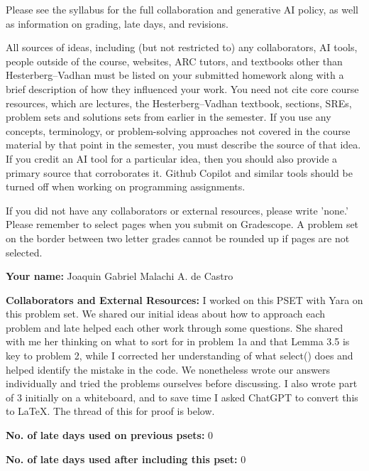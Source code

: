 \documentclass[11pt]{report}
\begin{document}

Please see the syllabus for the full collaboration and generative AI policy, as well as information on grading, late days, and revisions.

All sources of ideas, including (but not restricted to) any collaborators, AI tools, people outside of the course, websites, ARC tutors, and textbooks other than Hesterberg--Vadhan must be listed on your submitted homework along with a brief description of how they influenced your work. You need not cite core course resources, which are lectures, the Hesterberg--Vadhan textbook, sections, SREs, problem sets and solutions sets from earlier in the semester. If you use any concepts, terminology, or problem-solving approaches not covered in the course material by that point in the semester, you must describe the source of that idea. If you credit an AI tool for a particular idea, then you should also provide a primary source that corroborates it. Github Copilot and similar tools should be turned off when working on programming assignments.

If you did not have any collaborators or external resources, please write 'none.' Please remember to select pages when you submit on Gradescope. A problem set on the border between two letter grades cannot be rounded up if pages are not selected. 
\newline

\textbf{Your name: }Joaquin Gabriel Malachi A. de Castro

\textbf{Collaborators and External Resources: }I worked on this PSET with Yara on this problem set. We shared our initial ideas about how to approach each problem and late helped each other work through some questions. She shared with me her thinking on what to sort for in problem 1a and that Lemma 3.5 is key to problem 2, while I corrected her understanding of what select() does and helped identify the mistake in the code. We nonetheless wrote our answers individually and tried the problems ourselves before discussing. 
I also wrote part of 3 initially on a whiteboard, and to save time I asked ChatGPT to convert this to LaTeX. The thread of this for proof is below.

\textbf{No. of late days used on previous psets: }0

\textbf{No. of late days used after including this pset: }0

\vspace{1em}

\newpage
\end{document}
